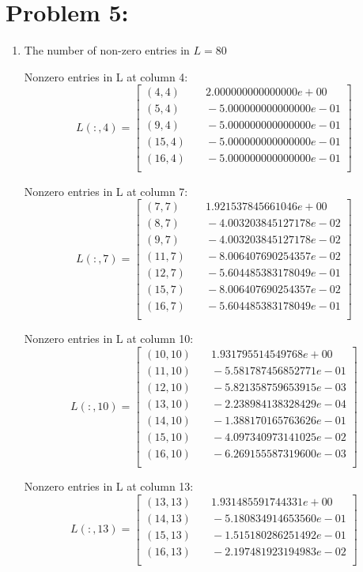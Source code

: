 \newpage
\section*{Problem 5:}
\begin{enumerate}
\item 
The number of non-zero entries in $L =80$ 

Nonzero entries in L at column 4:
$$
L(:,4) = 
\begin{bmatrix}
(4,4)  & \quad 2.000000000000000e+00\\
(5,4)  & \quad -5.000000000000000e-01\\
(9,4)  & \quad -5.000000000000000e-01\\
(15,4) & \quad -5.000000000000000e-01\\
(16,4) & \quad -5.000000000000000e-01\\
\end{bmatrix}
$$

Nonzero entries in L at column 7:
$$
L(:,7) = 
\begin{bmatrix}
(7,7)  & \quad       1.921537845661046e+00\\
(8,7)  & \quad      -4.003203845127178e-02\\
(9,7)  & \quad     -4.003203845127178e-02\\
(11,7) & \quad      -8.006407690254357e-02\\
(12,7) & \quad      -5.604485383178049e-01\\
(15,7) & \quad      -8.006407690254357e-02\\
(16,7) & \quad     -5.604485383178049e-01\\
\end{bmatrix}
$$

Nonzero entries in L at column 10:
$$
L(:,10) = 
\begin{bmatrix}
(10,10) & \quad       1.931795514549768e+00\\
(11,10) & \quad      -5.581787456852771e-01\\
(12,10) & \quad      -5.821358759653915e-03\\
(13,10) & \quad      -2.238984138328429e-04\\
(14,10) & \quad      -1.388170165763626e-01\\
(15,10) & \quad      -4.097340973141025e-02\\
(16,10) & \quad      -6.269155587319600e-03\\
\end{bmatrix}
$$

Nonzero entries in L at column 13:
$$
L(:,13) = 
\begin{bmatrix}
(13,13)  & \quad       1.931485591744331e+00\\
(14,13)  & \quad      -5.180834914653560e-01\\
(15,13)  & \quad      -1.515180286251492e-01\\
(16,13)  & \quad      -2.197481923194983e-02\\
\end{bmatrix}
$$


\end{enumerate}
